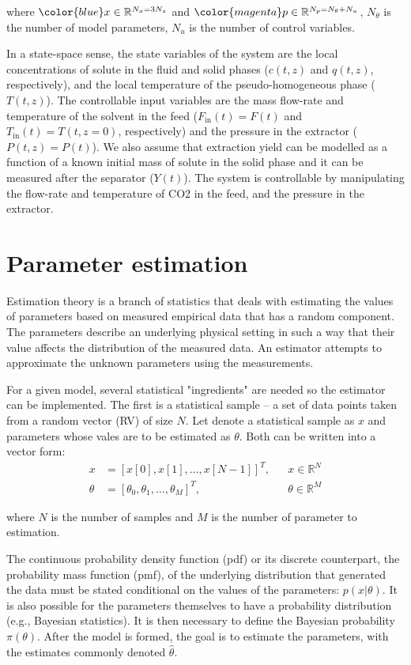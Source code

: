 \documentclass[a4paper,fleqn]{cas-dc}
\begin{document}
where ${\color{blue}x} \in \mathbb{R}^{N_x = 3N_z} $ and ${\color{magenta}p} \in \mathbb{R}^{N_p =  N_{\theta} + N_u } $, $N_{\theta}$ is the number of model parameters, $N_{u}$ is the number of control variables.

{\color{blue} In a state-space sense, the state variables of the system are the local concentrations of solute in the fluid and solid phases ($c(t,z)$ and $q(t,z)$, respectively), and the local temperature of the pseudo-homogeneous phase ($T(t,z)$). The controllable input variables are the mass flow-rate and temperature of the solvent in the feed ($F_\text{in}(t) = F(t)$ and $T_\text{in}(t) = T(t,z=0)$, respectively) and the pressure in the extractor ($P(t,z) = P(t)$). {\color{red}We also assume that extraction yield can be modelled as a function of a known initial mass of solute in the solid phase and it can be measured after the separator ($Y(t)$).} The system is controllable by manipulating the flow-rate and temperature of CO2 in the feed, and the pressure in the extractor. }

\newpage
\section{Parameter estimation} \label{CH: Parameter_estimation}
Estimation theory is a branch of statistics that deals with estimating the values of parameters based on measured empirical data that has a random component. The parameters describe an underlying physical setting in such a way that their value affects the distribution of the measured data. An estimator attempts to approximate the unknown parameters using the measurements.

For a given model, several statistical "ingredients" are needed so the estimator can be implemented. The first is a statistical sample – a set of data points taken from a random vector (RV) of size $N$. Let denote a statistical sample as $x$ and parameters whose vales are to be estimated as $\theta$. Both can be written into a vector form:
\begin{align}
	x &= [x[0], x[1], \dots, x[N-1] ]^T, &&x \in \mathbb{R}^N \\
	\theta &= [\theta_0, \theta_1, \dots, \theta_M ]^T,  &&\theta \in \mathbb{R}^M
\end{align}

where $N$ is the number of samples and $M$ is the number of parameter to estimation.

The continuous probability density function (pdf) or its discrete counterpart, the probability mass function (pmf), of the underlying distribution that generated the data must be stated conditional on the values of the parameters: $p(x|\theta)$. It is also possible for the parameters themselves to have a probability distribution (e.g., Bayesian statistics). It is then necessary to define the Bayesian probability $\pi(\theta)$. After the model is formed, the goal is to estimate the parameters, with the estimates commonly denoted $\hat{\theta}$.
\end{document}
